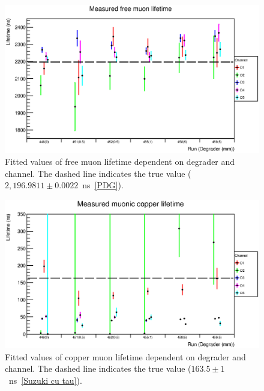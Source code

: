 \begin{figure}[hptb]
  \centering
    \includegraphics[width=.9\textwidth]{images/plot_generating_scripts/per_ch_free_lifetime.eps}
  \caption{Fitted values of free muon lifetime dependent on degrader and channel. The dashed line indicates the true value (\(2,196.9811\pm0.0022\)~ns~\ref{PDG}).}
  \label{fig:images_plot_generating_scripts_per_ch_free_lifetime}
\end{figure}
\begin{figure}[hptb]
  \centering
    \includegraphics[width=.9\textwidth]{images/plot_generating_scripts/per_ch_copper_lifetime.eps}
  \caption{Fitted values of copper muon lifetime dependent on degrader and channel. The dashed line indicates the true value (\(163.5\pm1\)~ns~\ref{Suzuki cu tau}).}
  \label{fig:images_plot_generating_scripts_per_ch_copper_lifetime}
\end{figure}


